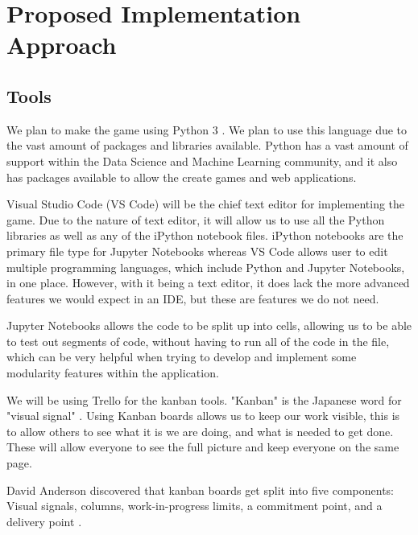 \documentclass[a4paper,10pt]{article}
\begin{document}
\section{Proposed Implementation Approach}
\subsection{Tools}
We plan to make the game using Python 3 \cite{reference here}. We plan to use this language due to the vast amount of packages and libraries available. Python has a vast amount of support within the Data Science and Machine Learning community, and it also has packages available to allow the create games and web applications. 

Visual Studio Code (VS Code) will be the chief text editor for implementing the game. Due to the nature of text editor, it will allow us to use all the Python libraries as well as any of the iPython notebook files. iPython notebooks are the primary file type for Jupyter Notebooks whereas VS Code allows user to edit multiple programming languages, which include Python and Jupyter Notebooks, in one place. However, with it being a text editor, it does lack the more advanced features we would expect in an IDE, but these are features we do not need.  

Jupyter Notebooks allows the code to be split up into cells, allowing us to be able to test out segments of code, without having to run all of the code in the file, which can be very helpful when trying to develop and implement some modularity features within the application.

We will be using Trello for the kanban tools. "Kanban" is the Japanese word for "visual signal" \cite{kanbanmeaning}. Using Kanban boards allows us to keep our work visible, this is to allow others to see what it is we are doing, and what is needed to get done. These will allow everyone to see the full picture and keep everyone on the same page.

David Anderson discovered that kanban boards get split into five components: Visual signals, columns, work-in-progress limits, a commitment point, and a delivery point \cite{anderson2010kanban}.
\end{document}
